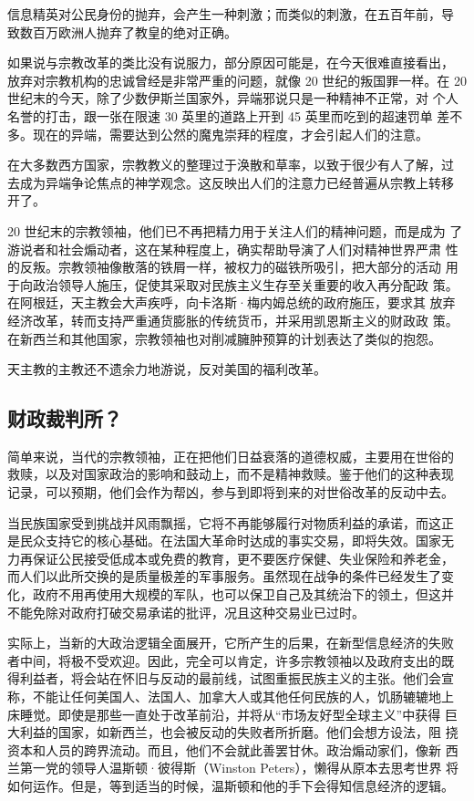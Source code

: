 信息精英对公民身份的抛弃，会产生一种刺激；而类似的刺激，在五百年前，导 致数百万欧洲人抛弃了教皇的绝对正确。

如果说与宗教改革的类比没有说服力，部分原因可能是，在今天很难直接看出， 放弃对宗教机构的忠诚曾经是非常严重的问题，就像 20 世纪的叛国罪一样。在 20 世纪末的今天，除了少数伊斯兰国家外，异端邪说只是一种精神不正常，对 个人名誉的打击，跟一张在限速 30 英里的道路上开到 45 英里而吃到的超速罚单 差不多。现在的异端，需要达到公然的魔鬼崇拜的程度，才会引起人们的注意。

在大多数西方国家，宗教教义的整理过于涣散和草率，以致于很少有人了解，过 去成为异端争论焦点的神学观念。这反映出人们的注意力已经普遍从宗教上转移 开了。

20 世纪末的宗教领袖，他们已不再把精力用于关注人们的精神问题，而是成为 了游说者和社会煽动者，这在某种程度上，确实帮助导演了人们对精神世界严肃 性的反叛。宗教领袖像散落的铁屑一样，被权力的磁铁所吸引，把大部分的活动 用于向政治领导人施压，促使其采取对民族主义生存至关重要的收入再分配政 策。在阿根廷，天主教会大声疾呼，向卡洛斯·梅内姆总统的政府施压，要求其 放弃经济改革，转而支持严重通货膨胀的传统货币，并采用凯恩斯主义的财政政 策。在新西兰和其他国家，宗教领袖也对削减臃肿预算的计划表达了类似的抱怨。

天主教的主教还不遗余力地游说，反对美国的福利改革。

\subsection{财政裁判所？}
简单来说，当代的宗教领袖，正在把他们日益衰落的道德权威，主要用在世俗的 救赎，以及对国家政治的影响和鼓动上，而不是精神救赎。鉴于他们的这种表现 记录，可以预期，他们会作为帮凶，参与到即将到来的对世俗改革的反动中去。

当民族国家受到挑战并风雨飘摇，它将不再能够履行对物质利益的承诺，而这正 是民众支持它的核心基础。在法国大革命时达成的事实交易，即将失效。国家无 力再保证公民接受低成本或免费的教育，更不要医疗保健、失业保险和养老金， 而人们以此所交换的是质量极差的军事服务。虽然现在战争的条件已经发生了变 化，政府不用再使用大规模的军队，也可以保卫自己及其统治下的领土，但这并 不能免除对政府打破交易承诺的批评，况且这种交易业已过时。

实际上，当新的大政治逻辑全面展开，它所产生的后果，在新型信息经济的失败 者中间，将极不受欢迎。因此，完全可以肯定，许多宗教领袖以及政府支出的既 得利益者，将会站在怀旧与反动的最前线，试图重振民族主义的主张。他们会宣 称，不能让任何美国人、法国人、加拿大人或其他任何民族的人，饥肠辘辘地上 床睡觉。即使是那些一直处于改革前沿，并将从“市场友好型全球主义”中获得 巨大利益的国家，如新西兰，也会被反动的失败者所折磨。他们会想方设法，阻 挠资本和人员的跨界流动。而且，他们不会就此善罢甘休。政治煽动家们，像新 西兰第一党的领导人温斯顿·彼得斯（Winston Peters），懒得从原本去思考世界 将如何运作。但是，等到适当的时候，温斯顿和他的手下会得知信息经济的逻辑。

